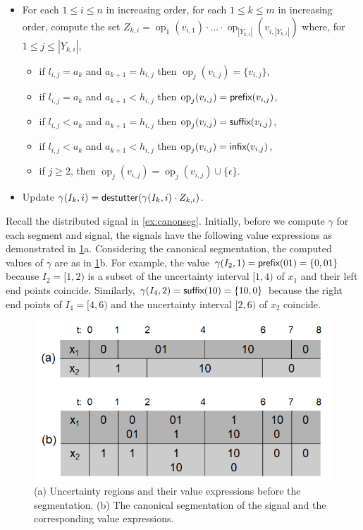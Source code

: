 \begin{itemize}
	\item For each $1 \leq i \leq n$ in increasing order, for each $1 \leq k \leq m$ in increasing order, compute the set $Z_{k,i} = \operatorname{op}_1(v_{i,1}) \cdot \ldots \cdot \operatorname{op}_{|Y_{k,i}|}(v_{i,|Y_{k,i}|})$ where, for $1 \leq j \leq |Y_{k,i}|$,
	\begin{itemize}
		\item if $l_{i,j} = a_k$ and $a_{k+1} = h_{i,j}$ then $\operatorname{op}_j(v_{i,j}) = \{v_{i,j}\}$,
		\item if $l_{i,j} = a_k$ and $a_{k+1} < h_{i,j}$ then $\operatorname{op}_j(v_{i,j}) = \textsf{prefix}(v_{i,j})$,
		\item if $l_{i,j} < a_k$ and $a_{k+1} = h_{i,j}$ then $\operatorname{op}_j(v_{i,j}) = \textsf{suffix}(v_{i,j})$,
		\item if $l_{i,j} < a_k$ and $a_{k+1} < h_{i,j}$ then $\operatorname{op}_j(v_{i,j}) = \textsf{infix}(v_{i,j})$,
		\item if $j \geq 2$, then $\operatorname{op}_j(v_{i,j}) = \operatorname{op}_j(v_{i,j}) \cup \{\epsilon\}$.
	\end{itemize}
	\item Update $\gamma(I_k, i) = \mathsf{destutter}(\gamma(I_k, i) \cdot Z_{k,i})$.
\end{itemize}

\begin{example}
	Recall the distributed signal in \cref{ex:canonseg}.
	Initially, before we compute $\gamma$ for each segment and signal, the signals have the following value expressions as demonstrated in \cref{fig:canonseg}a.
	Considering the canonical segmentation, the computed values of $\gamma$ are as in \cref{fig:canonseg}b.
	For example, the value $\gamma(I_2,1) = \textsf{prefix}(01) = \{0, 01\}$ because $I_2 = [1,2)$ is a subset of the uncertainty interval $[1,4)$ of $x_1$ and their left end points coincide.
	Similarly, $\gamma(I_4,2) = \textsf{suffix}(10) = \{ 10, 0\}$ because the right end points of $I_4 = [4,6)$ and the uncertainty interval $[2,6)$ of $x_2$ coincide.
\end{example}

\begin{figure} 
	\centering
	\includegraphics[scale=0.4]{canonseg.png}
	\caption{(a) Uncertainty regions and their value expressions before the segmentation. (b) The canonical segmentation of the signal and the corresponding value expressions.\label{fig:canonseg}}
\end{figure}

